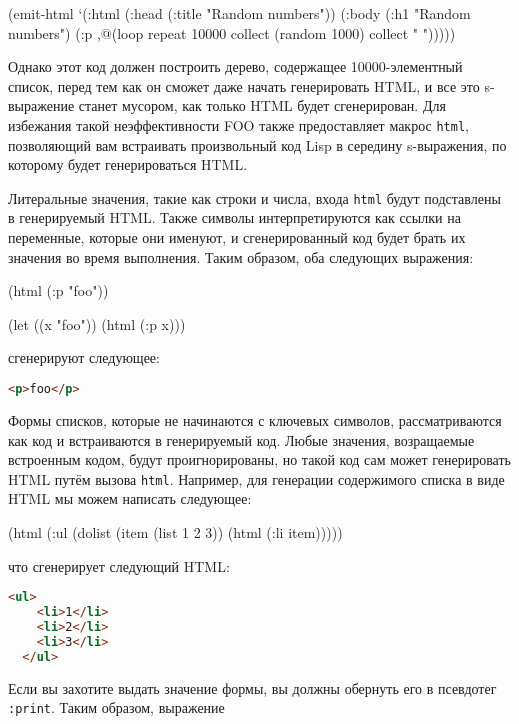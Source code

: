 \begin{myverb}
  (emit-html
    `(:html
       (:head
         (:title "Random numbers"))
       (:body 
         (:h1 "Random numbers")
         (:p ,@(loop repeat 10000 collect (random 1000) collect " ")))))
\end{myverb}

Однако этот код должен построить дерево, содержащее 10000-элементный список, перед тем как
он сможет даже начать генерировать HTML, и все это s-выражение станет мусором, как только
HTML будет сгенерирован. Для избежания такой неэффективности FOO также
предоставляет макрос \lstinline{html}, позволяющий вам встраивать произвольный код Lisp в
середину s-выражения, по которому будет генерироваться HTML.

Литеральные значения, такие как строки и числа, входа \lstinline{html} будут подставлены в
генерируемый HTML. Также символы интерпретируются как ссылки на переменные, которые они
именуют, и сгенерированный код будет брать их значения во время выполнения. Таким образом,
оба следующих выражения:

\begin{myverb}
  (html (:p "foo"))

  (let ((x "foo")) (html (:p x)))
\end{myverb}

\noindent{}сгенерируют следующее:

\begin{lstlisting}[language=HTML]
  <p>foo</p>
\end{lstlisting}

Формы списков, которые не начинаются с ключевых символов, рассматриваются как код и
встраиваются в генерируемый код. Любые значения, возращаемые встроенным кодом, будут
проигнорированы, но такой код сам может генерировать HTML путём вызова
\lstinline{html}. Например, для генерации содержимого списка в виде HTML мы можем написать
следующее:

\begin{myverb}
  (html (:ul (dolist (item (list 1 2 3)) (html (:li item)))))
\end{myverb}

\noindent{}что сгенерирует следующий HTML:

\begin{lstlisting}[language=HTML]
  <ul>
    <li>1</li>
    <li>2</li>
    <li>3</li>
  </ul>
\end{lstlisting}

Если вы захотите выдать значение формы, вы должны обернуть его в псевдотег
\lstinline{:print}. Таким образом, выражение

